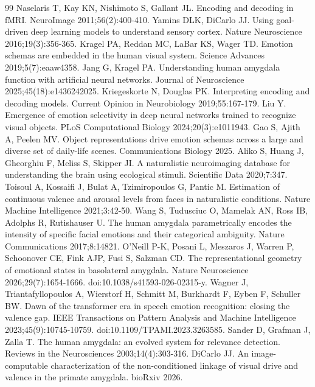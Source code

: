 \begin{thebibliography}{99}
 Naselaris T, Kay KN, Nishimoto S, Gallant JL. Encoding and decoding in fMRI. NeuroImage 2011;56(2):400-410.
 Yamins DLK, DiCarlo JJ. Using goal-driven deep learning models to understand sensory cortex. Nature Neuroscience 2016;19(3):356-365.
 Kragel PA, Reddan MC, LaBar KS, Wager TD. Emotion schemas are embedded in the human visual system. Science Advances 2019;5(7):eaaw4358.
 Jang G, Kragel PA. Understanding human amygdala function with artificial neural networks. Journal of Neuroscience 2025;45(18):e1436242025.
 Kriegeskorte N, Douglas PK. Interpreting encoding and decoding models. Current Opinion in Neurobiology 2019;55:167-179.
 Liu Y. Emergence of emotion selectivity in deep neural networks trained to recognize visual objects. PLoS Computational Biology 2024;20(3):e1011943.
 Gao S, Ajith A, Peelen MV. Object representations drive emotion schemas across a large and diverse set of daily-life scenes. Communications Biology 2025.
 Aliko S, Huang J, Gheorghiu F, Meliss S, Skipper JI. A naturalistic neuroimaging database for understanding the brain using ecological stimuli. Scientific Data 2020;7:347.
 Toisoul A, Kossaifi J, Bulat A, Tzimiropoulos G, Pantic M. Estimation of continuous valence and arousal levels from faces in naturalistic conditions. Nature Machine Intelligence 2021;3:42-50.
 Wang S, Tudusciuc O, Mamelak AN, Ross IB, Adolphs R, Rutishauser U. The human amygdala parametrically encodes the intensity of specific facial emotions and their categorical ambiguity. Nature Communications 2017;8:14821.
 O'Neill P-K, Posani L, Meszaros J, Warren P, Schoonover CE, Fink AJP, Fusi S, Salzman CD. The representational geometry of emotional states in basolateral amygdala. Nature Neuroscience 2026;29(7):1654-1666. doi:10.1038/s41593-026-02315-y.
 Wagner J, Triantafyllopoulos A, Wierstorf H, Schmitt M, Burkhardt F, Eyben F, Schuller BW. Dawn of the transformer era in speech emotion recognition: closing the valence gap. IEEE Transactions on Pattern Analysis and Machine Intelligence 2023;45(9):10745-10759. doi:10.1109/TPAMI.2023.3263585.
 Sander D, Grafman J, Zalla T. The human amygdala: an evolved system for relevance detection. Reviews in the Neurosciences 2003;14(4):303-316.
 DiCarlo JJ. An image-computable characterization of the non-conditioned linkage of visual drive and valence in the primate amygdala. bioRxiv 2026.

\end{thebibliography}
